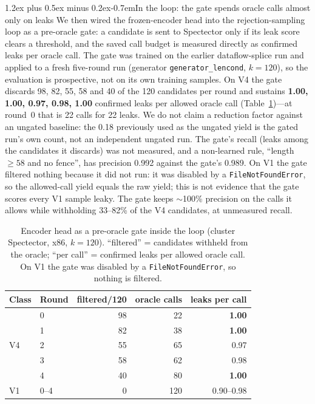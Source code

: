 \documentclass[conference]{IEEEtran}
\makeatletter
\renewcommand\paragraph{\@startsection{paragraph}{4}{\z@}%
  {1.2ex plus 0.5ex minus 0.2ex}{-0.7em}{\normalfont\normalsize\bfseries}}
\makeatother
\begin{document}
\paragraph{In the loop: the gate spends oracle calls almost only on leaks}
We then wired the frozen-encoder head into the rejection-sampling loop as a
pre-oracle gate: a candidate is sent to Spectector only if its leak score
clears a threshold, and the saved call budget is measured directly as
confirmed leaks per oracle call. The gate was trained on the earlier
dataflow-splice run and applied to a fresh five-round run (generator
\texttt{generator\_lencond}, $k{=}120$), so the evaluation is prospective, not
on its own training samples. On V4 the gate discards 98, 82, 55, 58 and 40 of
the 120 candidates per round and sustains \textbf{1.00, 1.00, 0.97, 0.98,
1.00} confirmed leaks per allowed oracle call (Table~\ref{tab:gateloop})---at
round~0 that is 22 calls for 22 leaks. We do not claim a reduction factor
against an ungated baseline: the 0.18 previously used as the ungated yield is
the gated run's own count, not an independent ungated run. The gate's recall
(leaks among the candidates it discards) was not measured, and a non-learned
rule, ``length $\ge 58$ and no fence'', has precision 0.992 against the
gate's 0.989. On V1 the gate filtered nothing because it did not run: it was
disabled by a \texttt{FileNotFoundError}, so the allowed-call yield equals the
raw yield; this is not evidence that the gate scores every V1 sample leaky.
The gate keeps $\sim$100\% precision on the calls it allows while withholding
33--82\% of the V4 candidates, at unmeasured recall.

\begin{table}[t]
\centering
\caption{Encoder head as a pre-oracle gate inside the loop (cluster
  Spectector, x86, $k{=}120$). ``filtered'' = candidates withheld from the
  oracle; ``per call'' = confirmed leaks per allowed oracle call. On V1 the
  gate was disabled by a \texttt{FileNotFoundError}, so nothing is filtered.}
\label{tab:gateloop}
\footnotesize
\setlength{\tabcolsep}{4pt}
\begin{tabular}{@{}llrrr@{}}
\toprule
Class & Round & filtered/120 & oracle calls & leaks per call \\
\midrule
\multirow{5}{*}{V4}
 & 0 & 98 & 22 & \textbf{1.00} \\
 & 1 & 82 & 38 & \textbf{1.00} \\
 & 2 & 55 & 65 & 0.97 \\
 & 3 & 58 & 62 & 0.98 \\
 & 4 & 40 & 80 & \textbf{1.00} \\
\midrule
V1 & 0--4 & 0 & 120 & 0.90--0.98 \\
\bottomrule
\end{tabular}
\end{table}
\end{document}
